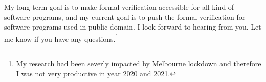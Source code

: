 \documentclass[11pt,a4paper,roman]{moderncv}
\begin{document}
\vspace{0.5cm}
My long term goal is to make formal verification accessible for all kind of 
software programs, and my current goal 
is to push the formal verification for software programs used in 
public domain. I look forward to hearing from you. Let me know if you have any 
questions.\footnote{My research had been severly impacted by Melbourne lockdown and therefore
I was not very productive in year 2020 and 2021.} \\
 

\vspace{0.5cm}


\makeletterclosing
\end{document}
